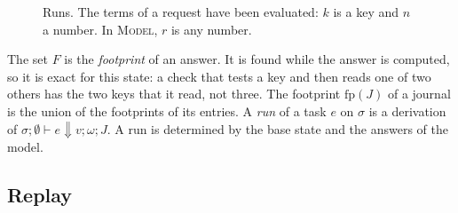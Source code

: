 \documentclass[acmsmall,nonacm,screen]{acmart}
\newcommand{\kw}[1]{\mathsf{#1}}
\newcommand{\letin}[3]{\kw{let}\;#1 = #2\;\kw{in}\;#3}
\newcommand{\rd}[1]{\kw{read}\;#1}
\newcommand{\wrt}[2]{\kw{write}\;#1\;#2}
\newcommand{\mdl}[1]{\kw{model}\;#1}
\newcommand{\chk}[1]{\kw{check}\;#1}
\newcommand{\scan}{\kw{scan}}
\newcommand{\evto}{\Downarrow}
\newcommand{\fp}[1]{\mathrm{fp}(#1)}
\newcommand{\dom}{\mathrm{dom}\,}
\newcommand{\upd}{\oplus}
\begin{document}
\begin{figure}[t]
\caption{Runs. The terms of a request have been evaluated: $k$ is a key and $n$ a number. In
\textsc{Model}, $r$ is any number.}
\label{fig:runs}
\end{figure}

The set $F$ is the \emph{footprint} of an answer. It is found while the answer is computed, so
it is exact for this state: a check that tests a key and then reads one of two others has
the two keys that it read, not three. The footprint $\fp{J}$ of a journal is the union of
the footprints of its entries. A \emph{run} of a task $e$ on $\sigma$ is a derivation of
$\sigma; \emptyset \vdash e \evto v; \omega; J$. A run is determined by the base state and
the answers of the model.

\subsection{Replay}
\label{sec:replay}
\end{document}
